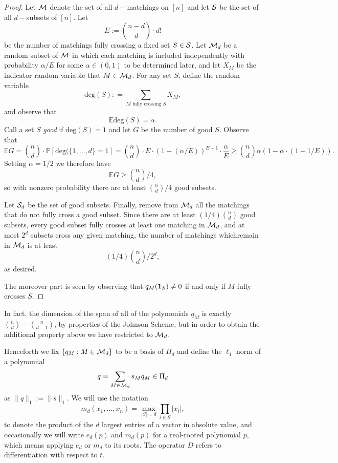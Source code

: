 \begin{proof} Let $\M$ denote the set of all $d-$matchings on $[n]$ and let $\S$ be the set of all $d-$subsets of $[n]$. Let 
$$E:=\binom{n-d}{d}\cdot d!$$
be the number of matchings fully crossing a fixed set $S\in\S$. Let $\M_d$ be a random subset of $\M$ in which each matching is included independently with probability $\alpha/E$ for some $\alpha\in (0,1)$ to be determined later, and let $X_M$ be the indicator random variable that $M\in\M_d$. For any set $S$, define the random variable
\renewcommand{\deg}{\mathrm{deg}}
\newcommand{\E}{\mathbb{E}}
\renewcommand{\P}{\mathbb{P}}
$$\deg(S): = \sum_{M\textrm{ fully crossing }S} X_M,$$
and observe that
$$\E \deg(S) = \alpha.$$
Call a set $S$ {\em good} if $\deg(S)=1$ and let $G$ be the number of good $S$. Observe that
$$\E G = \binom{n}{d}\cdot\P[\deg(\{1,\ldots,d\}=1] = \binom{n}{d}\cdot E\cdot (1-(\alpha/E))^{E-1}\cdot\frac{\alpha}{E}\ge \binom{n}{d}\alpha(1-\alpha\cdot(1-1/E)).$$ 
Setting $\alpha=1/2$ we therefore have
$$\E G \ge \binom{n}{d}/4,$$
so with nonzero probability there are at least $\binom{n}{d}/4$
good subsets.

Let $\S_d$ be the set of good subsets. Finally, remove from $\M_d$ all the matchings that do not fully cross a good subset. Since there are at least $(1/4)\binom{n}{d}$ good subsets, every good subset fully crosses at least one matching in $\M_d$, and at most $2^d$ subsets cross any given matching, the number of matchings whichremain in $\M_d$ is at least $$(1/4)\binom{n}{d}/2^d,$$
as desired.

The moreover part is seen by observing that $q_M(\one_S)\neq 0$ if and only if $M$ fully crosses $S$.
\end{proof}
\begin{remark} In fact, the dimension of the span of all of the polynomials $q_M$ is exactly $\binom{n}{d}-\binom{n}{d-1}$, by properties of the Johnson Scheme, but in order to obtain the additional property above we have restricted to $\M_d$.\end{remark}

Henceforth we fix $\{q_M:M\in\M_d\}$ to be a basis of $\Pi_d$ and define the
$\ell_1$ norm of a polynomial $$q = \sum_{M\in\M_d} s_M q_M\in \Pi_d$$ as
$\|q\|_1:=\|s\|_1$. We will use the notation
$$m_d(x_1,\ldots,x_n)=\max_{|S|=d}\prod_{i\in S}|x_i|,$$ to denote the product
of the $d$ largest entries of a vector in absolute value, and occasionally we
will write $e_d(p)$ and $m_d(p)$ for a real-rooted polynomial $p$, which means applying
$e_d$ or $m_d$ to its roots. The operator $D$ refers to differentiation with respect to $t$.
 

